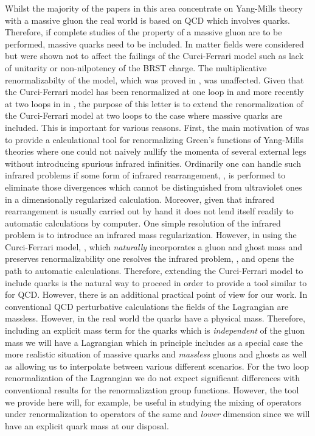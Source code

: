 \documentclass[a4paper,11pt]{article}
\providecommand{\MSbar}{\overline{\mbox{MS}}}
\begin{document}
Whilst the majority of the papers in this area concentrate on Yang-Mills theory
with a massive gluon the real world is based on QCD which involves quarks. 
Therefore, if complete studies of the property of a massive gluon are to be
performed, massive quarks need to be included. In \cite{6} matter fields were 
considered but were shown not to affect the failings of the Curci-Ferrari model
such as lack of unitarity or non-nilpotency of the BRST charge. The 
multiplicative renormalizabilty of the model, which was proved in 
\cite{4,8,9,10}, was unaffected. Given that the Curci-Ferrari model has been 
renormalized at one loop in \cite{8,12,15} and more recently at two loops in 
\myHighlight{$\MSbar$}\coordHE{} in \cite{16}, the purpose of this letter is to extend the 
renormalization of the Curci-Ferrari model at two loops to the case where 
massive quarks are included. This is important for various reasons. First, the 
main motivation of \cite{16} was to provide a calculational tool for 
renormalizing Green's functions of Yang-Mills theories where one could not 
naively nullify the momenta of several external legs without introducing 
spurious infrared infinities. Ordinarily one can handle such infrared problems
if some form of infrared rearrangement, \cite{15,16}, is performed to eliminate
those divergences which cannot be distinguished from ultraviolet ones in a 
dimensionally regularized calculation. Moreover, given that infrared 
rearrangement is usually carried out by hand it does not lend itself readily to
automatic calculations by computer. One simple resolution of the infrared 
problem is to introduce an infrared mass regularization. However, in using the 
Curci-Ferrari model, \cite{4}, which {\em naturally} incorporates a gluon and 
ghost mass and preserves renormalizability one resolves the infrared problem, 
\cite{19,10,15}, and opens the path to automatic calculations. Therefore, 
extending the Curci-Ferrari model to include quarks is the natural way to 
proceed in order to provide a tool similar to \cite{14} for QCD. However, there
is an additional practical point of view for our work. In conventional QCD 
perturbative calculations the fields of the Lagrangian are massless. However, 
in the real world the quarks have a physical mass. Therefore, including an 
explicit mass term for the quarks which is {\em independent} of the gluon mass 
we will have a Lagrangian which in principle includes as a special case the 
more realistic situation of massive quarks and {\em massless} gluons and ghosts
as well as allowing us to interpolate between various different scenarios. For 
the two loop \myHighlight{$\MSbar$}\coordHE{} renormalization of the Lagrangian we do not expect 
significant differences with conventional results for the renormalization group
functions. However, the tool we provide here will, for example, be useful in 
studying the mixing of operators under renormalization to operators of the same
and {\em lower} dimension since we will have an explicit quark mass at our 
disposal. 
\end{document}
